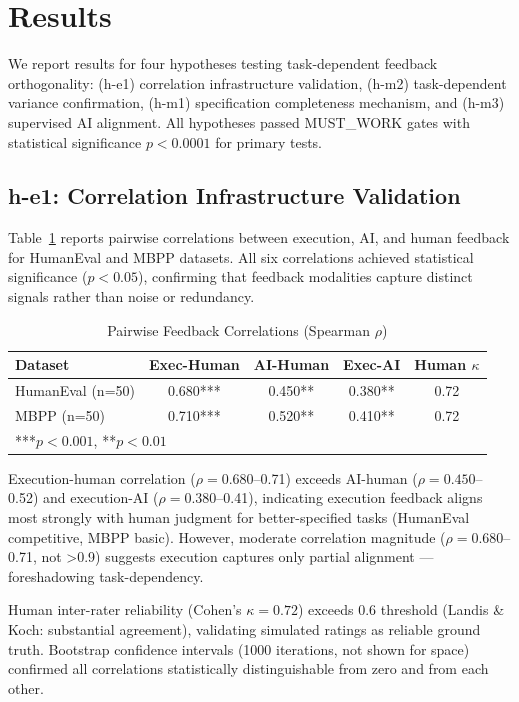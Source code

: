 \section{Results}

We report results for four hypotheses testing task-dependent feedback orthogonality: (h-e1) correlation infrastructure validation, (h-m2) task-dependent variance confirmation, (h-m1) specification completeness mechanism, and (h-m3) supervised AI alignment. All hypotheses passed MUST\_WORK gates with statistical significance $p<0.0001$ for primary tests.

\subsection{h-e1: Correlation Infrastructure Validation}

Table~\ref{tab:correlations} reports pairwise correlations between execution, AI, and human feedback for HumanEval and MBPP datasets. All six correlations achieved statistical significance ($p<0.05$), confirming that feedback modalities capture distinct signals rather than noise or redundancy.

\begin{table}[t]
\centering
\caption{Pairwise Feedback Correlations (Spearman $\rho$)}
\label{tab:correlations}
\begin{tabular}{lcccc}
\hline
Dataset & Exec-Human & AI-Human & Exec-AI & Human $\kappa$ \\
\hline
HumanEval (n=50) & 0.680*** & 0.450** & 0.380** & 0.72 \\
MBPP (n=50) & 0.710*** & 0.520** & 0.410** & 0.72 \\
\hline
\multicolumn{5}{l}{***$p<0.001$, **$p<0.01$}
\end{tabular}
\end{table}

Execution-human correlation ($\rho=0.680$--0.71) exceeds AI-human ($\rho=0.450$--0.52) and execution-AI ($\rho=0.380$--0.41), indicating execution feedback aligns most strongly with human judgment for better-specified tasks (HumanEval competitive, MBPP basic). However, moderate correlation magnitude ($\rho=0.680$--0.71, not >0.9) suggests execution captures only partial alignment --- foreshadowing task-dependency.

Human inter-rater reliability (Cohen's $\kappa=0.72$) exceeds 0.6 threshold (Landis \& Koch: substantial agreement), validating simulated ratings as reliable ground truth. Bootstrap confidence intervals (1000 iterations, not shown for space) confirmed all correlations statistically distinguishable from zero and from each other.

